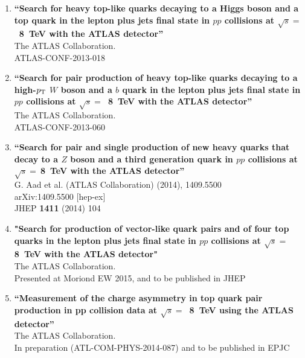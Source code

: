 \documentclass[12pt]{article}
\begin{document}
\begin{enumerate}
\item
{\bf ``Search for heavy top-like quarks decaying to a Higgs boson and a top quark in the lepton plus jets final state in $pp$ collisions at $\sqrt{s}=$~8~TeV with the ATLAS detector''}
  \\{}The ATLAS Collaboration.
  \\{}ATLAS-CONF-2013-018
  
\item
{\bf ``Search for pair production of heavy top-like quarks decaying to a high-$p_{\rm T}$ $W$ boson and a $b$ quark in the lepton plus jets final state in $pp$ collisions at $\sqrt{s}=$~8~TeV with the ATLAS detector''}
  \\{}The ATLAS Collaboration.
 \\{}ATLAS-CONF-2013-060

\item
{\bf ``Search for pair and single production of new heavy quarks that decay to a $Z$ boson and a third generation quark in $pp$ collisions at $\sqrt{s}=~$8~TeV with the ATLAS detector''}
  \\{}G. Aad et al. (ATLAS Collaboration) (2014), 1409.5500
   \\{}arXiv:1409.5500 [hep-ex]
   \\{}JHEP {\bf 1411} (2014) 104
   

 \item
{\bf "Search for production of vector-like quark pairs and of four top quarks in the lepton plus jets final state in $pp$ collisions at $\sqrt{s}=~$8~TeV with the ATLAS detector"}
\\{}The ATLAS Collaboration.
\\{}Presented at Moriond EW 2015, and to be published in JHEP

\item
{\bf ``Measurement of the charge asymmetry in top quark pair production in pp collision data at $\sqrt{s}=$~8~TeV using the ATLAS detector''}
  \\{}The ATLAS Collaboration.
  \\{}In preparation (ATL-COM-PHYS-2014-087) and to be published in EPJC


\end{enumerate}
\end{document}
